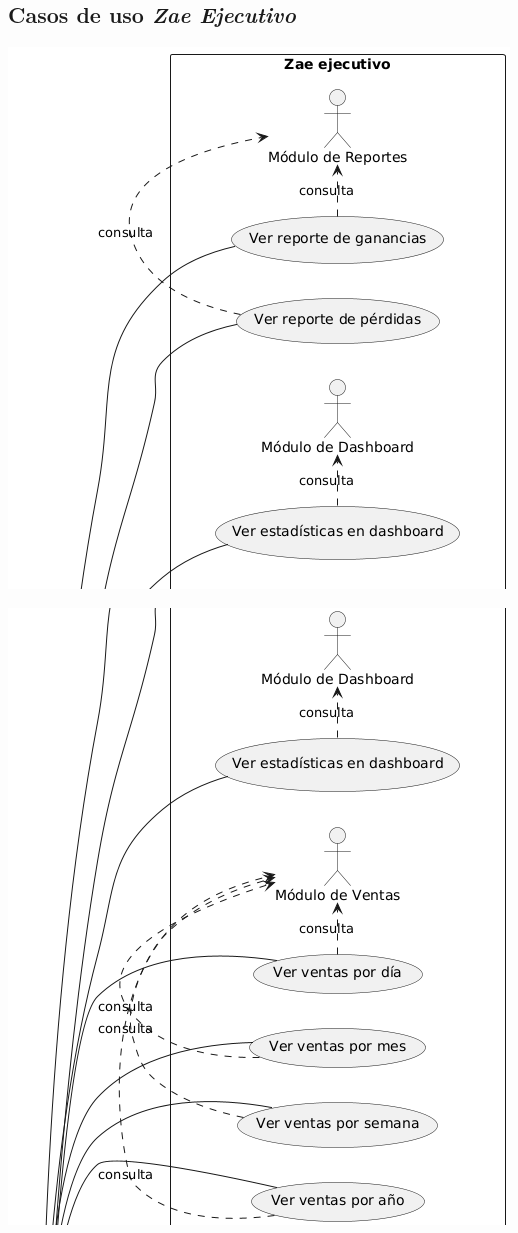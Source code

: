 \documentclass[protocolo.tex]{subfiles}
\begin{document}
\subsection{Casos de uso \textit{Zae Ejecutivo}}
\includegraphics[scale=0.5]{Imagenes/zaeEjept1.png}


\includegraphics[scale=0.5]{Imagenes/zaeEjept2.png}
\end{document}
